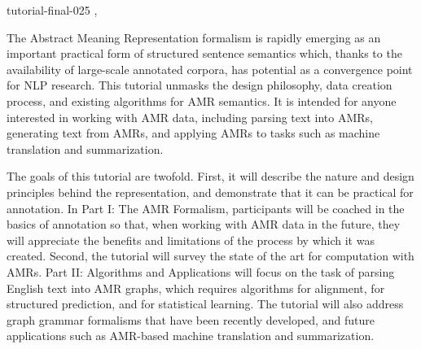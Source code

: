 \begin{tutorial}
  {tutorial-final-025}
  {\daydateyear, \tutorialmorningtime}
  {\TutLocC}

The Abstract Meaning Representation formalism is rapidly emerging as
an important practical form of structured sentence semantics which,
thanks to the availability of large-scale annotated corpora, has
potential as a convergence point for NLP research. This tutorial
unmasks the design philosophy, data creation process, and existing
algorithms for AMR semantics. It is intended for anyone interested in
working with AMR data, including parsing text into AMRs, generating
text from AMRs, and applying AMRs to tasks such as machine translation
and summarization.

The goals of this tutorial are twofold. First, it will describe the
nature and design principles behind the representation, and
demonstrate that it can be practical for annotation. In Part I: The
AMR Formalism, participants will be coached in the basics of
annotation so that, when working with AMR data in the future, they
will appreciate the benefits and limitations of the process by which
it was created. Second, the tutorial will survey the state of the art
for computation with AMRs. Part II: Algorithms and Applications will
focus on the task of parsing English text into AMR graphs, which
requires algorithms for alignment, for structured prediction, and for
statistical learning. The tutorial will also address graph grammar
formalisms that have been recently developed, and future applications
such as AMR-based machine translation and summarization.

\end{tutorial}
